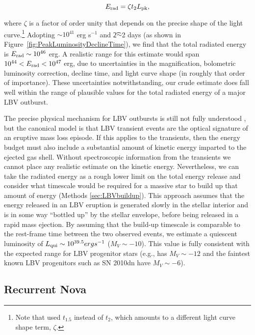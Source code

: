 \begin{equation}
  \label{eqn:Erad}
  E_{\rm rad} = \zeta \t2 \Lpk,
\end{equation}

\noindent where $\zeta$ is a factor of order unity that depends on the
precise shape of the light curve.\footnote{Note that
  \citet{Smith:2011b} used $t_{1.5}$ instead of $t_2$, which amounts
  to a different light curve shape term, $\zeta$.}  Adopting
\Lpk$\sim10^{41}$ erg s$^{-1}$ and \t2$\sim$2 days (as shown in
Figure~\ref{fig:PeakLuminosityDeclineTime}), we find that the total
radiated energy is $E_{\rm rad}\sim10^{46}$ erg.  A realistic range
for this estimate would span $10^{44}<E_{\rm rad}<10^{47}$ erg, due to
uncertainties in the magnification, bolometric luminosity correction,
decline time, and light curve shape (in roughly that order of
importance). These uncertainties notwithstanding, our crude estimate
does fall well within the range of plausible values for the total
radiated energy of a major LBV outburst.

The precise physical mechanism for LBV outbursts is still not fully
understood \citep[e.g.][]{Smith:2006,Woosley:2007,Dessart:2010}, but
the canonical model is that LBV transient events are the optical
signature of an eruptive mass loss episode.  If this applies to the
\spock transients, then the energy budget must also include a
substantial amount of kinetic energy imparted to the ejected gas
shell. Without spectroscopic information from the \spock transients we
cannot place any realistic estimate on the kinetic
energy. Nevertheless, we can take the radiated energy as a rough lower
limit on the total energy release and consider what timescale would be
required for a massive star to build up that amount of energy (Methods \ref{sec:LBVbuildup}). This approach assumes that the energy
released in an LBV eruption is generated slowly in the stellar
interior and is in some way ``bottled up'' by the stellar envelope,
before being released in a rapid mass ejection.  By assuming that the
build-up timescale is comparable to the rest-frame time between the
two observed events, we estimate a quiescent luminosity of
$L_{\rm  qui}\sim10^{39.5} erg s^{-1}$ ($M_V\sim-10$).  This value is fully
consistent with the expected range for LBV progenitor stars (e.g.,
\etacar has $M_V\sim-12$ and the faintest known LBV progenitors such
as SN 2010dn have $M_V\sim-6$).


\subsection{Recurrent Nova}\label{sec:RNe}

